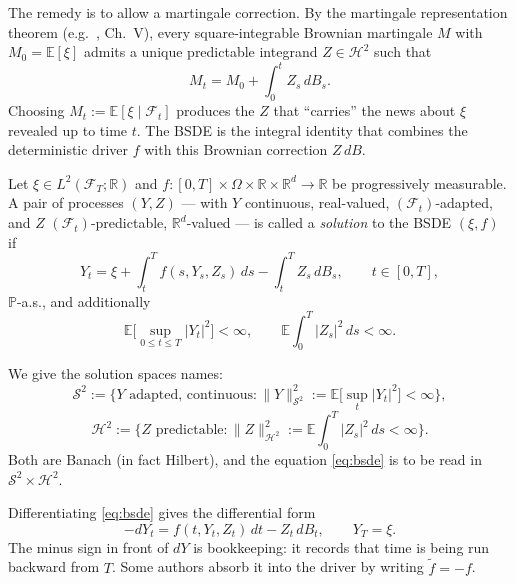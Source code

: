 \documentclass{article}
\newcommand{\E}{\mathbb{E}}
\newcommand{\Prob}{\mathbb{P}}
\newcommand{\R}{\mathbb{R}}
\newcommand{\F}{\mathcal{F}}
\newcommand{\Sc}{\mathcal{S}}
\newcommand{\Hc}{\mathcal{H}}
\begin{document}
The remedy is to allow a martingale correction. By the martingale representation theorem (e.g.\ \cite{revuz-yor}, Ch.~V), every square-integrable Brownian martingale $M$ with $M_0 = \E[\xi]$ admits a unique predictable integrand $Z \in \Hc^2$ such that
\[
  M_t = M_0 + \int_0^t Z_s\, dB_s.
\]
Choosing $M_t := \E[\xi \mid \F_t]$ produces the $Z$ that ``carries'' the news about $\xi$ revealed up to time $t$. The BSDE is the integral identity that combines the deterministic driver $f$ with this Brownian correction $Z\, dB$.

\begin{definition}\label{def:bsde}
Let $\xi \in L^2(\F_T; \R)$ and $f : [0,T] \times \Omega \times \R \times \R^d \to \R$ be progressively measurable. A pair of processes $(Y, Z)$ --- with $Y$ continuous, real-valued, $(\F_t)$-adapted, and $Z$ $(\F_t)$-predictable, $\R^d$-valued --- is called a \emph{solution} to the BSDE $(\xi, f)$ if
\begin{equation}\label{eq:bsde}
  Y_t = \xi + \int_t^T f(s, Y_s, Z_s)\,ds - \int_t^T Z_s\, dB_s, \qquad t \in [0, T],
\end{equation}
$\Prob$-a.s., and additionally
\[
  \E\!\Big[\sup_{0 \le t \le T}|Y_t|^2\Big] < \infty, \qquad \E\!\int_0^T |Z_s|^2\,ds < \infty.
\]
\end{definition}

We give the solution spaces names:
\[
  \Sc^2 := \Big\{Y \text{ adapted, continuous} : \|Y\|_{\Sc^2}^2 := \E\!\big[\sup_t |Y_t|^2\big] < \infty\Big\},
\]
\[
  \Hc^2 := \Big\{Z \text{ predictable} : \|Z\|_{\Hc^2}^2 := \E\!\int_0^T |Z_s|^2\,ds < \infty\Big\}.
\]
Both are Banach (in fact Hilbert), and the equation \eqref{eq:bsde} is to be read in $\Sc^2 \times \Hc^2$.

\begin{remark}
Differentiating \eqref{eq:bsde} gives the differential form
\[
  -dY_t = f(t, Y_t, Z_t)\,dt - Z_t\, dB_t, \qquad Y_T = \xi.
\]
The minus sign in front of $dY$ is bookkeeping: it records that time is being run backward from $T$. Some authors absorb it into the driver by writing $\widetilde{f} = -f$.
\end{remark}
\end{document}
